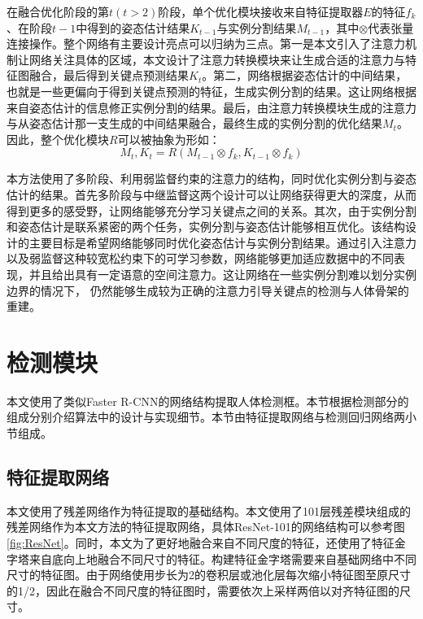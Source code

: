在融合优化阶段的第$t(t>2)$阶段，单个优化模块接收来自特征提取器$E$的特征$f_k$、在阶段$t-1$中得到的姿态估计结果$K_{t-1}$与实例分割结果$M_{t-1}$，其中$\otimes$代表张量连接操作。整个网络有主要设计亮点可以归纳为三点。第一是本文引入了注意力机制让网络关注具体的区域，本文设计了注意力转换模块来让生成合适的注意力与特征图融合，最后得到关键点预测结果$K_t$。第二，网络根据姿态估计的中间结果，也就是一些更偏向于得到关键点预测的特征，生成实例分割的结果。这让网络根据来自姿态估计的信息修正实例分割的结果。最后，由注意力转换模块生成的注意力与从姿态估计那一支生成的中间结果融合，最终生成的实例分割的优化结果$M_t$。因此，整个优化模块$R$可以被抽象为形如：
\begin{equation}
\label{def:refinenet}
M_t, K_t = R(M_{t-1}\otimes f_k, K_{t-1}\otimes f_k)
\end{equation}

本方法使用了多阶段、利用弱监督约束的注意力的结构，同时优化实例分割与姿态估计的结果。首先多阶段与中继监督这两个设计可以让网络获得更大的深度，从而得到更多的感受野，让网络能够充分学习关键点之间的关系\cite{wei2016convolutional}。其次，由于实例分割和姿态估计是联系紧密的两个任务，实例分割与姿态估计能够相互优化。该结构设计的主要目标是希望网络能够同时优化姿态估计与实例分割结果。通过引入注意力以及弱监督这种较宽松约束下的可学习参数，网络能够更加适应数据中的不同表现，并且给出具有一定语意的空间注意力\cite{wang2017residual}。这让网络在一些实例分割难以划分实例边界的情况下， 仍然能够生成较为正确的注意力引导关键点的检测与人体骨架的重建。

\section{检测模块}
\label{sec:detectionstage}
本文使用了类似Faster R-CNN\cite{Ren2015Faster}的网络结构提取人体检测框。本节根据检测部分的组成分别介绍算法中的设计与实现细节。本节由特征提取网络与检测回归网络两小节组成。

\subsection{特征提取网络}
\label{subsec:featextract}
本文使用了残差网络作为特征提取的基础结构。本文使用了101层残差模块组成的残差网络作为本文方法的特征提取网络，具体ResNet-101的网络结构可以参考图\ref{fig:ResNet}。同时，本文为了更好地融合来自不同尺度的特征，还使用了特征金字塔\cite{Lin2016Feature}来自底向上地融合不同尺寸的特征。构建特征金字塔需要来自基础网络中不同尺寸的特征图。由于网络使用步长为2的卷积层或池化层每次缩小特征图至原尺寸的1/2，因此在融合不同尺度的特征图时，需要依次上采样两倍以对齐特征图的尺寸。

